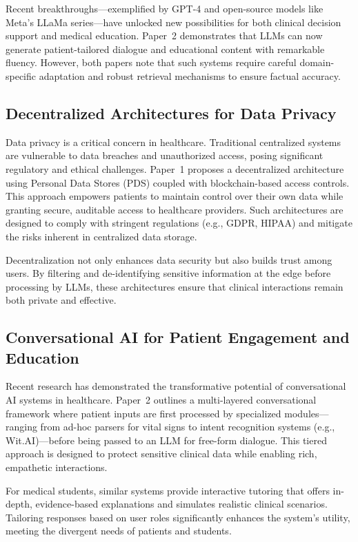 Recent breakthroughs—exemplified by GPT-4 and open-source models like Meta’s LLaMa series—have unlocked new possibilities for both clinical decision support and medical education. Paper~2 demonstrates that LLMs can now generate patient-tailored dialogue and educational content with remarkable fluency. However, both papers note that such systems require careful domain-specific adaptation and robust retrieval mechanisms to ensure factual accuracy.

\subsection{Decentralized Architectures for Data Privacy}
Data privacy is a critical concern in healthcare. Traditional centralized systems are vulnerable to data breaches and unauthorized access, posing significant regulatory and ethical challenges. Paper~1 proposes a decentralized architecture using Personal Data Stores (PDS) coupled with blockchain-based access controls. This approach empowers patients to maintain control over their own data while granting secure, auditable access to healthcare providers. Such architectures are designed to comply with stringent regulations (e.g., GDPR, HIPAA) and mitigate the risks inherent in centralized data storage.

Decentralization not only enhances data security but also builds trust among users. By filtering and de-identifying sensitive information at the edge before processing by LLMs, these architectures ensure that clinical interactions remain both private and effective.

\subsection{Conversational AI for Patient Engagement and Education}
Recent research has demonstrated the transformative potential of conversational AI systems in healthcare. Paper~2 outlines a multi-layered conversational framework where patient inputs are first processed by specialized modules—ranging from ad-hoc parsers for vital signs to intent recognition systems (e.g., Wit.AI)—before being passed to an LLM for free-form dialogue. This tiered approach is designed to protect sensitive clinical data while enabling rich, empathetic interactions.

For medical students, similar systems provide interactive tutoring that offers in-depth, evidence-based explanations and simulates realistic clinical scenarios. Tailoring responses based on user roles significantly enhances the system’s utility, meeting the divergent needs of patients and students.

